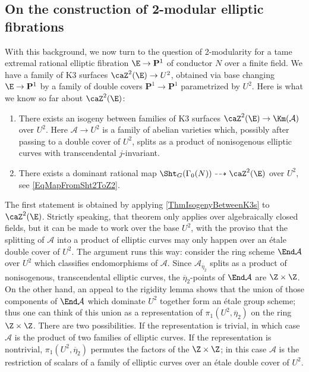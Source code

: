 \documentclass{article}
\def\P{\mathbf{P}}
\begin{document}
\subsection{On the construction of 2-modular elliptic fibrations}\label{sec:modular-fibrations}

With this background, we now turn to the question of 2-modularity for a tame extremal rational elliptic fibration $\E\to \P^1$ of conductor $N$ over a finite field.  We have a family of K3 surfaces $\caZ^2(\E)\to U^2$, obtained via base changing $\E\to \P^1$ by a family of double covers $\P^1\to \P^1$ parametrized by $U^2$.  Here is what we
know so far about $\caZ^2(\E)$:
\begin{enumerate}
        \item There exists an isogeny between families of K3 surfaces $\caZ^2(\E)\to \Km(\mathcal{A})$ over $U^2$.  Here $\mathcal{A}\to U^2$ is a family of abelian varieties which, possibly after passing to a double cover of $U^2$, splits as a product of nonisogenous elliptic curves with transcendental $j$-invariant.  
    \item There exists a dominant rational map $\Sht_G(\Gamma_0(N))\dashrightarrow \caZ^2(\E)$ over $U^2$, see \eqref{EqMapFromSht2ToZ2}. 
\end{enumerate}

\begin{rmk} The first statement is obtained by applying \ref{ThmIsogenyBetweenK3s}
to $\caZ^2(\E)$.  Strictly speaking, that theorem only applies over algebraically closed fields, but it can be made to work over the base $U^2$, with the proviso that the splitting of $\mathcal{A}$ into a product of elliptic curves may only happen over an \'etale double cover of $U^2$.  The argument runs this way:  consider the ring scheme $\End \mathcal{A}$ over $U^2$ which classifies endomorphisms of $\mathcal{A}$.  Since 
$\mathcal{A}_{\overline{\eta}_2}$ splits as a product of nonisogenous, transcendental elliptic curves, the $\overline{\eta}_2$-points of $\End \mathcal{A}$ are $\Z\times \Z$.  On the other hand, an appeal to the rigidity lemma shows that the union of those components of $\End \mathcal{A}$ which dominate $U^2$ together form an \'etale group scheme;  thus one can think of this union as a representation of $\pi_1(U^2,\overline{\eta}_2)$ on the ring $\Z\times \Z$.  There are two possibilities.    If the representation is trivial, in which case $\mathcal{A}$ is the product of two families of elliptic curves.  If the representation is nontrivial,   $\pi_1(U^2,\overline{\eta}_2)$ permutes the factors of the $\Z\times\Z$;  in this case $\mathcal{A}$ is the restriction of scalars of a family of elliptic curves over an \'etale double cover of $U^2$.
\end{rmk}
\end{document}
